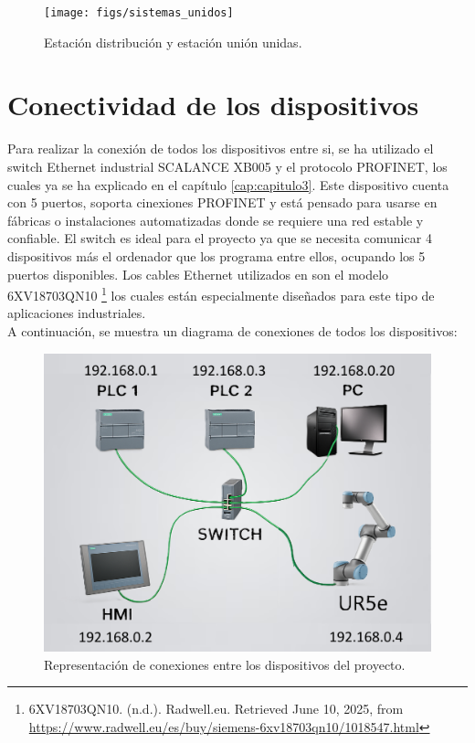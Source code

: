 \clearpage

\begin{figure}[h!]
  \begin{center}
    \texttt{[image: figs/sistemas\_unidos]}
  \end{center}
  \caption{\centering Estación distribución y estación unión unidas.}
  \label{fig:sistemas_unidos}
\end{figure}


\section{Conectividad de los dispositivos}
\label{sec:conectividad_dispositivos}

Para realizar la conexión de todos los dispositivos entre si, se ha utilizado el switch Ethernet industrial SCALANCE XB005 y el protocolo PROFINET, los cuales ya se ha explicado en el capítulo \ref{cap:capitulo3}. Este dispositivo cuenta con 5 puertos, soporta cinexiones PROFINET y está pensado para usarse en fábricas o instalaciones automatizadas donde se requiere una red estable y confiable. El switch es ideal para el proyecto ya que se necesita comunicar 4 dispositivos más el ordenador que los programa entre ellos, ocupando los 5 puertos disponibles. Los cables Ethernet utilizados en son el modelo 6XV18703QN10 \footnote{6XV18703QN10. (n.d.). Radwell.eu. Retrieved June 10, 2025, from \url{https://www.radwell.eu/es/buy/siemens-6xv18703qn10/1018547.html}} los cuales están especialmente diseñados para este tipo de aplicaciones industriales.  \\

A continuación, se muestra un diagrama de conexiones de todos los dispositivos:

\begin{figure} [h!]
  \begin{center}
    \includegraphics[width=14cm]{figs/conexion_dispositivos}
  \end{center}
  \caption{\centering Representación de conexiones entre los dispositivos del proyecto.}
  \label{fig:conexion_dispositivos}
\end{figure} 

